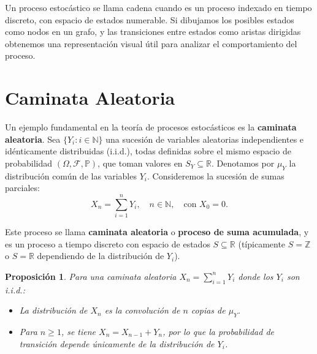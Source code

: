 \documentclass[12pt]{book}
\newtheorem{proposition}{Proposición}[chapter]
\begin{document}
Un proceso estocástico se llama cadena cuando es un proceso indexado en tiempo discreto, con espacio de estados numerable. Si dibujamos los posibles estados como nodos en un grafo, y las transiciones entre estados como aristas dirigidas obtenemos una representación visual útil para analizar el comportamiento del proceso.

\section{Caminata Aleatoria}

Un ejemplo fundamental en la teoría de procesos estocásticos es la \textbf{caminata aleatoria}. Sea $\{Y_i : i \in \mathbb{N}\}$ una sucesión de variables aleatorias independientes e idénticamente distribuidas (i.i.d.), todas definidas sobre el mismo espacio de probabilidad $(\Omega, \mathcal{F}, \mathbb{P})$, que toman valores en $S_Y \subseteq \mathbb{R}$. Denotamos por $\mu_Y$ la distribución común de las variables $Y_i$. Consideremos la sucesión de sumas parciales:
\[
X_n = \sum_{i=1}^n Y_i, \quad n \in \mathbb{N}, \quad \text{con } X_0 = 0.
\]

Este proceso se llama \textbf{caminata aleatoria} o \textbf{proceso de suma acumulada}, y es un proceso a tiempo discreto con espacio de estados $S \subseteq \mathbb{R}$ (típicamente $S = \mathbb{Z}$ o $S = \mathbb{R}$ dependiendo de la distribución de $Y_i$).

\begin{proposition}
Para una caminata aleatoria $X_n = \sum_{i=1}^n Y_i$ donde los $Y_i$ son i.i.d.:
\begin{itemize}
    \item La distribución de $X_n$ es la convolución de $n$ copias de $\mu_Y$.
    \item Para $n \geq 1$, se tiene $X_n = X_{n-1} + Y_n$, por lo que la probabilidad de transición depende únicamente de la distribución de $Y_i$.
\end{itemize}
\end{proposition}
\end{document}
